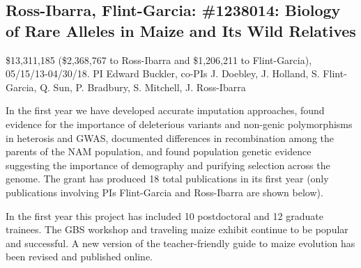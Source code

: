 \subsection*{Ross-Ibarra, Flint-Garcia: \#1238014: Biology of Rare Alleles in Maize and Its Wild Relatives}
\$13,311,185 (\$2,368,767 to Ross-Ibarra and \$1,206,211 to Flint-Garcia), 05/15/13-04/30/18. PI Edward Buckler, co-PIs J. Doebley, J. Holland, S. Flint-Garcia, Q. Sun, P. Bradbury, S. Mitchell, J. Ross-Ibarra
\par{} In the first year we have developed accurate imputation approaches, found evidence for the importance of deleterious variants and non-genic polymorphisms in heterosis and GWAS, documented differences in recombination among the parents of the NAM population, and found population genetic evidence suggesting the importance of demography and purifying selection across the genome.  The grant has produced 18 total publications in its first year (only publications involving PIs Flint-Garcia and Ross-Ibarra are shown below). 
\par{}  In the first year this project has included 10 postdoctoral and 12 graduate trainees. The GBS workshop and traveling maize exhibit continue to be popular and successful. A new version of the teacher-friendly guide to maize evolution has been revised and published online. 
\par{} \citet{peiffer2013genetic, Romay2013, wills2013many, Mezmouk2014, Peiffer2014, sood2014mining}


